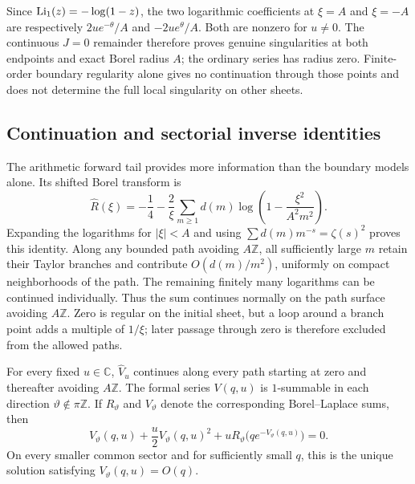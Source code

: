 Since $\operatorname{Li}_1(z)=-\log(1-z)$, the two logarithmic coefficients at
$\xi=A$ and $\xi=-A$ are respectively
$2u e^{-\theta}/A$ and $-2u e^\theta/A$.
Both are nonzero for $u\ne0$. The continuous $J=0$ remainder therefore
proves genuine singularities at both endpoints and exact Borel radius
$A$; the ordinary series has radius zero. Finite-order boundary
regularity alone gives no continuation through those points and does
not determine the full local singularity on other sheets.

\subsection{Continuation and sectorial inverse identities}

The arithmetic forward tail provides more information than the boundary
models alone. Its shifted Borel transform is
\begin{equation}\label{llc:forward-borel}
 \widehat R(\xi)=-\frac14-\frac2\xi
       \sum_{m\ge1}d(m)\log\!\left(1-\frac{\xi^2}{A^2m^2}\right).
\end{equation}
Expanding the logarithms for $|\xi|<A$ and using
$\sum d(m)m^{-s}=\zeta(s)^2$ proves this identity. Along any bounded
path avoiding $A\mathbb Z$, all sufficiently large $m$ retain their
Taylor branches and contribute $O(d(m)/m^2)$, uniformly on compact
neighborhoods of the path. The remaining finitely many logarithms can
be continued individually. Thus the sum continues normally on the path
surface avoiding $A\mathbb Z$. Zero is regular on the initial sheet,
but a loop around a branch point adds a multiple of $1/\xi$; later
passage through zero is therefore excluded from the allowed paths.

\begin{theorem}
\label{llc:continuation-theorem}
For every fixed $u\in\mathbb C$, $\widehat V_u$ continues along every
path starting at zero and thereafter avoiding $A\mathbb Z$.
The formal series $V(q,u)$ is $1$-summable in each direction
$\vartheta\notin\pi\mathbb Z$. If $R_\vartheta$ and $V_\vartheta$
denote the corresponding Borel--Laplace sums, then
\begin{equation}\label{llc:summed-inverse}
 V_\vartheta(q,u)+\frac u2 V_\vartheta(q,u)^2
       +uR_\vartheta\bigl(qe^{-V_\vartheta(q,u)}\bigr)=0.
\end{equation}
On every smaller common sector and for sufficiently small $q$, this is
the unique solution satisfying $V_\vartheta(q,u)=O(q)$.
\end{theorem}

